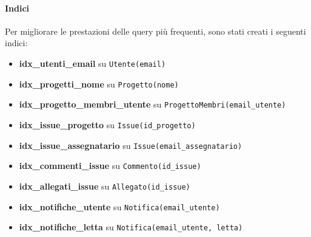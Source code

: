 \paragraph{Indici}
Per migliorare le prestazioni delle query più frequenti, sono stati creati i seguenti indici:
\begin{itemize}
    \item \textbf{idx\_utenti\_email} su \texttt{Utente(email)}
    \item \textbf{idx\_progetti\_nome} su \texttt{Progetto(nome)}
    \item \textbf{idx\_progetto\_membri\_utente} su \texttt{ProgettoMembri(email\_utente)}
    \item \textbf{idx\_issue\_progetto} su \texttt{Issue(id\_progetto)}
    \item \textbf{idx\_issue\_assegnatario} su \texttt{Issue(email\_assegnatario)}
    \item \textbf{idx\_commenti\_issue} su \texttt{Commento(id\_issue)}
    \item \textbf{idx\_allegati\_issue} su \texttt{Allegato(id\_issue)}
    \item \textbf{idx\_notifiche\_utente} su \texttt{Notifica(email\_utente)}
    \item \textbf{idx\_notifiche\_letta} su \texttt{Notifica(email\_utente, letta)}
\end{itemize}

